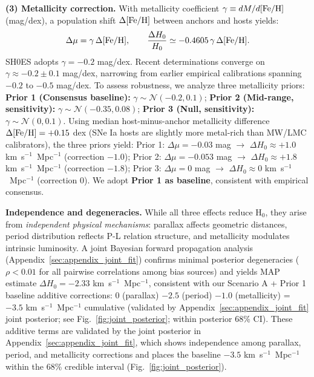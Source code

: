 \documentclass[preprint, linenumbers]{aastex701}
\begin{document}
\textbf{(3) Metallicity correction.} With metallicity coefficient $\gamma \equiv dM/d{\rm [Fe/H]}$ (mag/dex), a population shift $\Delta{\rm [Fe/H]}$ between anchors and hosts yields:
\begin{equation}
\Delta\mu = \gamma\,\Delta{\rm [Fe/H]}, \qquad \frac{\Delta H_0}{H_0} \simeq -0.4605\,\gamma\,\Delta{\rm [Fe/H]}.
\end{equation}
SH0ES adopts $\gamma = -0.2$ mag/dex. Recent determinations converge on $\gamma \approx -0.2 \pm 0.1$ mag/dex, narrowing from earlier empirical calibrations spanning $-0.2$ to $-0.5$ mag/dex. To assess robustness, we analyze three metallicity priors: \textbf{Prior 1 (Consensus baseline):} $\gamma \sim \mathcal{N}(-0.2, 0.1)$; \textbf{Prior 2 (Mid-range, sensitivity):} $\gamma \sim \mathcal{N}(-0.35, 0.08)$; \textbf{Prior 3 (Null, sensitivity):} $\gamma \sim \mathcal{N}(0, 0.1)$. Using median host-minus-anchor metallicity difference $\Delta{\rm [Fe/H]} = +0.15$ dex (SNe Ia hosts are slightly more metal-rich than MW/LMC calibrators), the three priors yield: Prior 1: $\Delta\mu = -0.03$ mag $\rightarrow$ $\Delta H_0 \approx +1.0$ km~s$^{-1}$~Mpc$^{-1}$ (correction $-1.0$); Prior 2: $\Delta\mu = -0.053$ mag $\rightarrow$ $\Delta H_0 \approx +1.8$ km~s$^{-1}$~Mpc$^{-1}$ (correction $-1.8$); Prior 3: $\Delta\mu = 0$ mag $\rightarrow$ $\Delta H_0 \approx 0$ km~s$^{-1}$~Mpc$^{-1}$ (correction $0$). We adopt \textbf{Prior 1 as baseline}, consistent with empirical consensus.

\textbf{Independence and degeneracies.} While all three effects reduce H$_0$, they arise from \textit{independent physical mechanisms}: parallax affects geometric distances, period distribution reflects P-L relation structure, and metallicity modulates intrinsic luminosity. A joint Bayesian forward propagation analysis (Appendix~\ref{sec:appendix_joint_fit}) confirms minimal posterior degeneracies ($\rho < 0.01$ for all pairwise correlations among bias sources) and yields MAP estimate $\Delta H_0 = -2.33$ km~s$^{-1}$~Mpc$^{-1}$, consistent with our Scenario A + Prior 1 baseline additive corrections: 0 (parallax) $-2.5$ (period) $-1.0$ (metallicity) = $-3.5$ km~s$^{-1}$~Mpc$^{-1}$ cumulative (validated by Appendix~\ref{sec:appendix_joint_fit} joint posterior; see Fig.~\ref{fig:joint_posterior}; within posterior 68\% CI). These additive terms are validated by the joint posterior in Appendix~\ref{sec:appendix_joint_fit}, which shows independence among parallax, period, and metallicity corrections and places the baseline $-3.5$ km~s$^{-1}$~Mpc$^{-1}$ within the 68\% credible interval (Fig.~\ref{fig:joint_posterior}).
\end{document}
